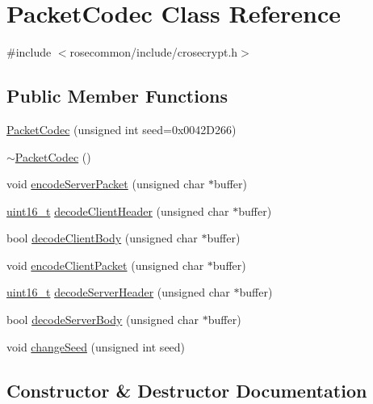 \hypertarget{classPacketCodec}{}\section{Packet\+Codec Class Reference}
\label{classPacketCodec}


{\ttfamily \#include $<$rosecommon/include/crosecrypt.\+h$>$}

\subsection*{Public Member Functions}
\begin{DoxyCompactItemize}
\item 
\hyperlink{classPacketCodec_af5076f3934efefc2383cc3a0414784ab}{Packet\+Codec} (unsigned int seed=0x0042\+D266)
\item 
\hyperlink{classPacketCodec_a4da74febdcdd96286a61590f5b2bf489}{$\sim$\+Packet\+Codec} ()
\item 
void \hyperlink{classPacketCodec_a7b4fbb4772a79a8d26093b15f7fed6cb}{encode\+Server\+Packet} (unsigned char $\ast$buffer)
\item 
\hyperlink{stdint_8h_a273cf69d639a59973b6019625df33e30}{uint16\+\_\+t} \hyperlink{classPacketCodec_a03c807711bfc939b0d27125683832dac}{decode\+Client\+Header} (unsigned char $\ast$buffer)
\item 
bool \hyperlink{classPacketCodec_a7c040ee471f449f6eb7eb9b81514e80d}{decode\+Client\+Body} (unsigned char $\ast$buffer)
\item 
void \hyperlink{classPacketCodec_a48fdc9c5cae80527fac83d5eb9344684}{encode\+Client\+Packet} (unsigned char $\ast$buffer)
\item 
\hyperlink{stdint_8h_a273cf69d639a59973b6019625df33e30}{uint16\+\_\+t} \hyperlink{classPacketCodec_ae3c09d11fe66cbc5115eb08c487b4681}{decode\+Server\+Header} (unsigned char $\ast$buffer)
\item 
bool \hyperlink{classPacketCodec_a60857bd77baaa3cbf8ebfd5d493bd8cb}{decode\+Server\+Body} (unsigned char $\ast$buffer)
\item 
void \hyperlink{classPacketCodec_a9744a55192c25f1b21ef6acefddeada6}{change\+Seed} (unsigned int seed)
\end{DoxyCompactItemize}


\subsection{Constructor \& Destructor Documentation}
